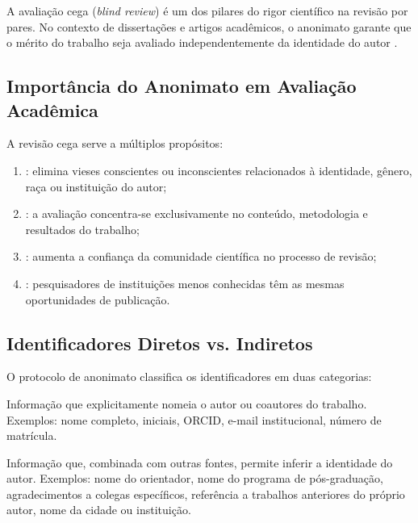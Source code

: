 A avaliação cega (\textit{blind review}) é um dos pilares do rigor científico
na revisão por pares. No contexto de dissertações e artigos acadêmicos, o
anonimato garante que o mérito do trabalho seja avaliado independentemente da
identidade do autor \cite{popper2005logica, kuhn1998estrutura}.

\subsection{Importância do Anonimato em Avaliação Acadêmica}

A revisão cega serve a múltiplos propósitos:

\begin{enumerate}
\item {}: elimina vieses conscientes ou inconscientes
      relacionados à identidade, gênero, raça ou instituição do autor;
\item {}: a avaliação concentra-se exclusivamente no
      conteúdo, metodologia e resultados do trabalho;
\item {}: aumenta a confiança da comunidade científica no
      processo de revisão;
\item {}: pesquisadores de instituições menos conhecidas têm
      as mesmas oportunidades de publicação.
\end{enumerate}

\subsection{Identificadores Diretos vs. Indiretos}

O protocolo de anonimato classifica os identificadores em duas categorias:

\begin{definicao}
Informação que explicitamente nomeia o autor ou coautores do trabalho.
Exemplos: nome completo, iniciais, ORCID, e-mail institucional, número de
matrícula.
\end{definicao}

\begin{definicao}
Informação que, combinada com outras fontes, permite inferir a identidade do
autor. Exemplos: nome do orientador, nome do programa de pós-graduação,
agradecimentos a colegas específicos, referência a trabalhos anteriores do
próprio autor, nome da cidade ou instituição.
\end{definicao}

